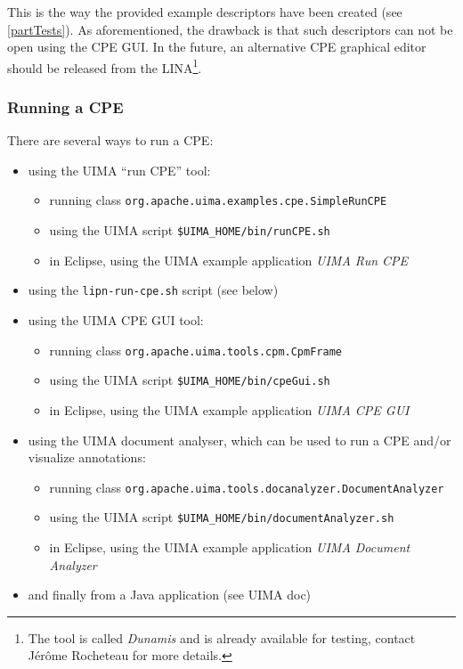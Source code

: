 \documentclass{article}
\newenvironment{xitemize}{
\begin{itemize}
  \setlength{\itemsep}{.3\baselineskip}
  \setlength{\topsep}{0pt}
  \setlength{\parskip}{0pt}
  \setlength{\parsep}{0pt}
}{\end{itemize}}
\begin{document}
This is the way the provided example descriptors have been created (see \ref{partTests}). As aforementioned, the drawback is that such descriptors can not be open using the CPE GUI. In the future, an alternative CPE graphical editor should be released from the LINA\footnote{The tool is called {\em Dunamis} and is already available for testing, contact Jérôme Rocheteau for more details.}.





\subsubsection{Running a CPE}

There are several ways to run a CPE: 
\begin{xitemize}
\item using the UIMA ``run CPE'' tool:
\begin{xitemize}
\item running class {\tt org.apache.uima.examples.cpe.SimpleRunCPE}
\item using the UIMA script {\tt \$UIMA\_HOME/bin/runCPE.sh}
\item in Eclipse, using the UIMA example application {\em UIMA Run CPE}
\end{xitemize}
\item using the {\tt lipn-run-cpe.sh} script (see below)
\item using the UIMA CPE GUI tool:
\begin{xitemize}
\item running class {\tt org.apache.uima.tools.cpm.CpmFrame}
\item using the UIMA script {\tt \$UIMA\_HOME/bin/cpeGui.sh}
\item in Eclipse, using the UIMA example application {\em UIMA CPE GUI}
\end{xitemize}
\item using the UIMA document analyser, which can be used to run a CPE and/or visualize annotations:
\begin{xitemize}
\item running class {\tt org.apache.uima.tools.docanalyzer.DocumentAnalyzer}
\item using the UIMA script {\tt \$UIMA\_HOME/bin/documentAnalyzer.sh}
\item in Eclipse, using the UIMA example application {\em UIMA Document Analyzer}
\end{xitemize}
\item and finally from a Java application (see UIMA doc)
\end{xitemize}
\end{document}
